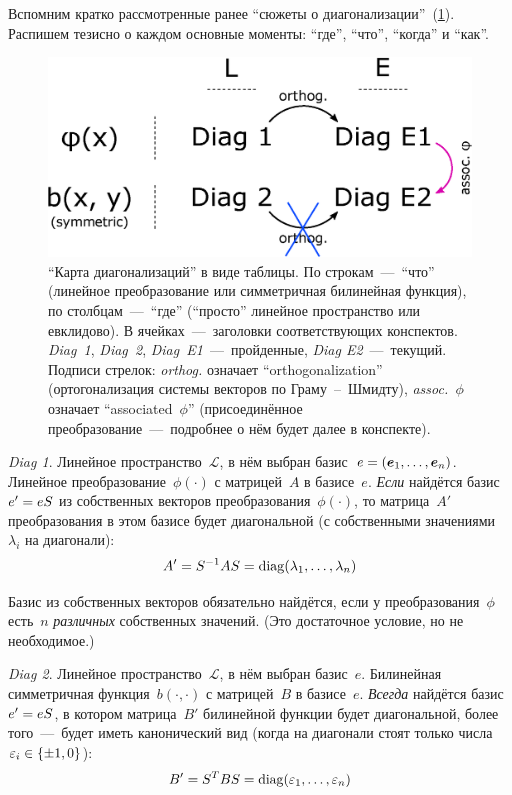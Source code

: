 \documentclass[a4paper,12pt]{article}
\theoremstyle{remark}
\begin{document}
  Вспомним кратко рассмотренные ранее ``сюжеты о диагонализации''~(\ref{fig:diag-scheme}).
  Распишем тезисно о каждом основные моменты: ``где'', ``что'', ``когда'' и ``как''.
  
  \begin{figure}[h]
    \centering
    
    \includegraphics[width=0.7\columnwidth]{diag-scheme}
    
    \caption{``Карта диагонализаций'' в виде таблицы. По строкам~---~``что'' (линейное преобразование или симметричная билинейная функция), по столбцам~---~``где'' (``просто'' линейное пространство или евклидово). В ячейках~---~заголовки соответствующих конспектов. \emph{Diag~1}, \emph{Diag~2}, \emph{Diag~E1}~---~пройденные, \emph{Diag E2}~---~текущий. Подписи стрелок: \emph{orthog.} означает ``orthogonalization'' (ортогонализация системы векторов по Граму~--~Шмидту), \emph{assoc.~$\phi$} означает ``associated~$\phi$'' (присоединённое преобразование~---~подробнее о нём будет далее в конспекте).}
    \label{fig:diag-scheme}
  \end{figure}
  
  \emph{Diag 1}.
  Линейное пространство~$\mathcal L$, в нём выбран базис~$e \hm= (\bds e_1, \ldots, \bds e_n)$.
  Линейное преобразование~$\phi(\cdot)$ с матрицей~$A$ в базисе~$e$.
  \emph{Если} найдётся базис~$e' \hm= e S$ из собственных векторов преобразования~$\phi(\cdot)$, то матрица~$A'$ преобразования в этом базисе будет диагональной (с собственными значениями~$\lambda_i$ на диагонали):
  \begin{equation}\label{eq:diag1-matrix-change}
    A' = S^{-1} A S = \operatorname{diag}(\lambda_1, \ldots, \lambda_n)
  \end{equation}
  
  Базис из собственных векторов обязательно найдётся, если у преобразования~$\phi$ есть~$n$ \emph{различных} собственных значений.
  (Это достаточное условие, но не необходимое.)
  
  \smallskip
  
  \emph{Diag 2}.
  Линейное пространство~$\mathcal L$, в нём выбран базис~$e$.
  Билинейная симметричная функция~$b(\cdot, \cdot)$ с матрицей~$B$ в базисе~$e$.
  \emph{Всегда} найдётся базис~$e' \hm= e S$, в котором матрица~$B'$ билинейной функции будет диагональной, более того~---~будет иметь канонический вид (когда на диагонали стоят только числа $\eps_i \hm\in \{\pm 1, 0\}$):
  \begin{equation}\label{eq:diag2-matrix-change}
    B' = S^T B S = \operatorname{diag}(\varepsilon_1, \ldots, \varepsilon_n)
  \end{equation}
  
\end{document}
